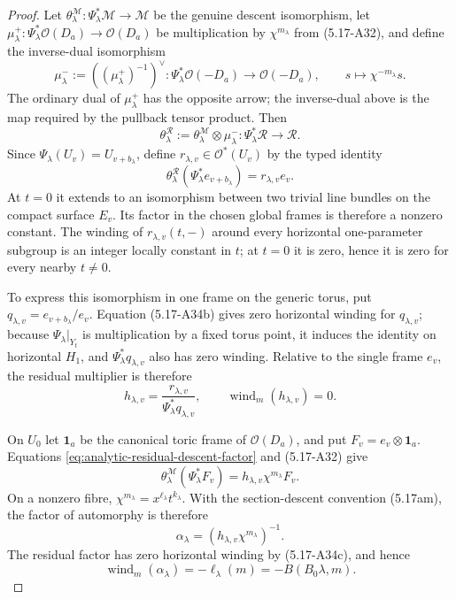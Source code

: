 \begin{proof}
Let
\(\theta^{\mathcal M}_\lambda:\Psi_\lambda^*\mathcal M\to\mathcal M\)
be the genuine descent isomorphism, let
\(\mu^+_\lambda:\Psi_\lambda^*\mathcal O(D_a)\to\mathcal O(D_a)\)
be multiplication by \(\chi^{m_\lambda}\) from (5.17-A32), and define the
inverse-dual isomorphism
\[
 \mu^-_\lambda:=((\mu^+_\lambda)^{-1})^\vee:
 \Psi_\lambda^*\mathcal O(-D_a)\longrightarrow\mathcal O(-D_a),
 \qquad s\longmapsto\chi^{-m_\lambda}s.
\]
The ordinary dual of \(\mu^+_\lambda\) has the opposite arrow; the
inverse-dual above is the map required by the pullback tensor product.  Then
\[
 \theta^{\mathcal R}_\lambda
 :=\theta^{\mathcal M}_\lambda\otimes\mu^-_\lambda:
 \Psi_\lambda^*\mathcal R\longrightarrow\mathcal R.
\]
Since \(\Psi_\lambda(U_v)=U_{v+b_\lambda}\), define
\(r_{\lambda,v}\in\mathcal O^*(U_v)\) by the typed identity
\begin{equation}
 \theta^{\mathcal R}_\lambda
   (\Psi_\lambda^*e_{v+b_\lambda})
 =r_{\lambda,v}e_v.
\label{eq:analytic-residual-descent-factor}
\end{equation}
At \(t=0\) it extends to an isomorphism between two trivial line bundles
on the compact surface \(E_v\).  Its factor in the chosen global frames is
therefore a nonzero constant.  The winding of
\(r_{\lambda,v}(t,-)\) around every horizontal one-parameter subgroup is
an integer locally constant in \(t\); at \(t=0\) it is zero, hence it is
zero for every nearby \(t\ne0\).

To express this isomorphism in one frame on the generic torus, put
\(q_{\lambda,v}=e_{v+b_\lambda}/e_v\).  Equation (5.17-A34b) gives zero
horizontal winding for \(q_{\lambda,v}\); because
\(\Psi_\lambda|_{Y_t}\) is multiplication by a fixed torus point, it
induces the identity on horizontal \(H_1\), and
\(\Psi_\lambda^*q_{\lambda,v}\) also has zero winding.  Relative to the
single frame \(e_v\), the residual multiplier is therefore
\[
 h_{\lambda,v}
 =\frac{r_{\lambda,v}}{\Psi_\lambda^*q_{\lambda,v}},
 \qquad
 \operatorname{wind}_m(h_{\lambda,v})=0.
\tag{5.17-A34c}
\]

On \(U_0\) let \(\mathbf1_a\) be the canonical toric frame of
\(\mathcal O(D_a)\), and put \(F_v=e_v\otimes\mathbf1_a\).  Equations
\cref{eq:analytic-residual-descent-factor} and (5.17-A32) give
\[
 \theta^{\mathcal M}_\lambda(\Psi_\lambda^*F_v)
 =h_{\lambda,v}\chi^{m_\lambda}F_v.
\]
On a nonzero fibre, \(\chi^{m_\lambda}=x^{\ell_\lambda}t^{k_\lambda}\).
With the section-descent convention (5.17am), the factor of automorphy is
therefore
\[
 \alpha_\lambda=(h_{\lambda,v}\chi^{m_\lambda})^{-1}.
\]
The residual factor has zero horizontal winding by (5.17-A34c), and hence
\begin{equation}
 \operatorname{wind}_m(\alpha_\lambda)
 =-\ell_\lambda(m)=-B(B_0\lambda,m).
\label{eq:analytic-factor-horizontal-winding}
\end{equation}


\end{proof}
